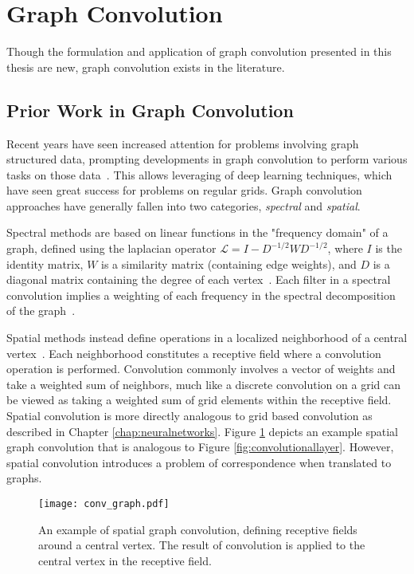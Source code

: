 \section{Graph Convolution}
Though the formulation and application of graph convolution presented in this thesis are new, graph convolution exists in the literature.


\subsection{Prior Work in Graph Convolution}
Recent years have seen increased attention for problems involving graph structured data, prompting developments in graph convolution to perform various tasks on those data~\cite{bronstein2016}.
This allows leveraging of deep learning techniques, which have seen great success for problems on regular grids.
Graph convolution approaches have generally fallen into two categories, \textit{spectral} and \textit{spatial}.

Spectral methods are based on linear functions in the "frequency domain" of a graph, defined using the laplacian operator $\mathcal{L}=I-D^{-1/2}WD^{-1/2}$, where $I$ is the identity matrix, $W$ is a similarity matrix (containing edge weights), and $D$ is a diagonal matrix containing the degree of each vertex~\cite{bruna2013, henaff2015, kipf2016}.
Each filter in a spectral convolution implies a weighting of each frequency in the spectral decomposition of the graph~\cite{mallat2009}.

Spatial methods instead define operations in a localized neighborhood of a central vertex~\cite{henaff2015, atwood2016}.
Each neighborhood constitutes a receptive field where a convolution operation is performed.
Convolution commonly involves a vector of weights and take a weighted sum of neighbors, much like a discrete convolution on a grid can be viewed as taking a weighted sum of grid elements within the receptive field.
Spatial convolution is more directly analogous to grid based convolution as described in Chapter \ref{chap:neuralnetworks}.
Figure \ref{fig:spatial_graph_conv} depicts an example spatial graph convolution that is analogous to Figure \ref{fig:convolutionallayer}.
However, spatial convolution introduces a problem of correspondence when translated to graphs.

\begin{figure}
	\centering
	\texttt{[image: conv\_graph.pdf]}
	\caption{An example of spatial graph convolution, defining receptive fields around a central vertex. The result of convolution is applied to the central vertex in the receptive field.}
	\label{fig:spatial_graph_conv}
\end{figure}

